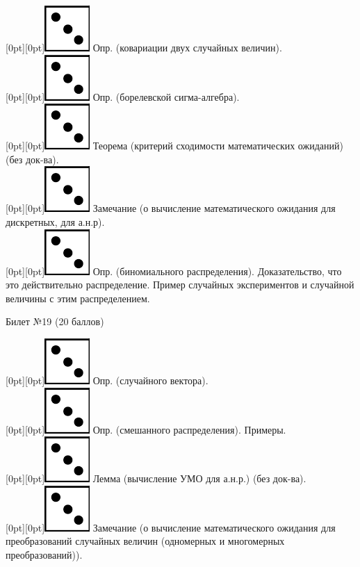 \documentclass[preview]{standalone}
\begin{document}
\raisebox{-1pt}[0pt][0pt]{\includegraphics[width=0.02\linewidth]{3.png}} Опр. (ковариации двух случайных величин). \\
\raisebox{-1pt}[0pt][0pt]{\includegraphics[width=0.02\linewidth]{3.png}} Опр. (борелевской сигма-алгебра). \\
\raisebox{-1pt}[0pt][0pt]{\includegraphics[width=0.02\linewidth]{3.png}} Теорема (критерий сходимости математических ожиданий) (без док-ва). \\
\raisebox{-1pt}[0pt][0pt]{\includegraphics[width=0.02\linewidth]{3.png}} Замечание (о вычисление  математического ожидания для дискретных, для а.н.р). \\
\raisebox{-1pt}[0pt][0pt]{\includegraphics[width=0.02\linewidth]{3.png}}  Опр. (биномиального распределения). Доказательство, что это действительно распределение. Пример случайных экспериментов и случайной величины с этим распределением. \\     
\begin{center} {\Large Билет №19 (20 баллов)} \end{center}
\raisebox{-1pt}[0pt][0pt]{\includegraphics[width=0.02\linewidth]{3.png}} Опр. (случайного вектора). \\
\raisebox{-1pt}[0pt][0pt]{\includegraphics[width=0.02\linewidth]{3.png}} Опр. (смешанного распределения). Примеры. \\
\raisebox{-1pt}[0pt][0pt]{\includegraphics[width=0.02\linewidth]{3.png}} Лемма (вычисление УМО для а.н.р.)  (без док-ва). \\
\raisebox{-1pt}[0pt][0pt]{\includegraphics[width=0.02\linewidth]{3.png}} Замечание (о вычисление  математического ожидания для преобразований случайных величин (одномерных и многомерных преобразований)). \\
\end{document}
